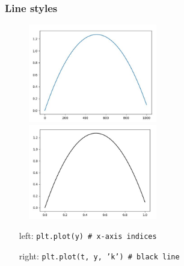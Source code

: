 \documentclass[14pt]{beamer}
\begin{document}
\begin{frame}[fragile]
\frametitle{Line styles}

\begin{figure}[ht]
	\centering
	\includegraphics[width=0.5\textwidth]{figures/LLp23aoutput}%
	\includegraphics[width=0.5\textwidth]{figures/LLp23boutput}
\end{figure}
\vspace*{-8mm}
\begin{itemize}
	\item[left:] \texttt{plt.plot(y) \# x-axis indices}
	\item[right:] \texttt{plt.plot(t, y, 'k')  \# black line}
\end{itemize}

\end{frame}

\end{document}
